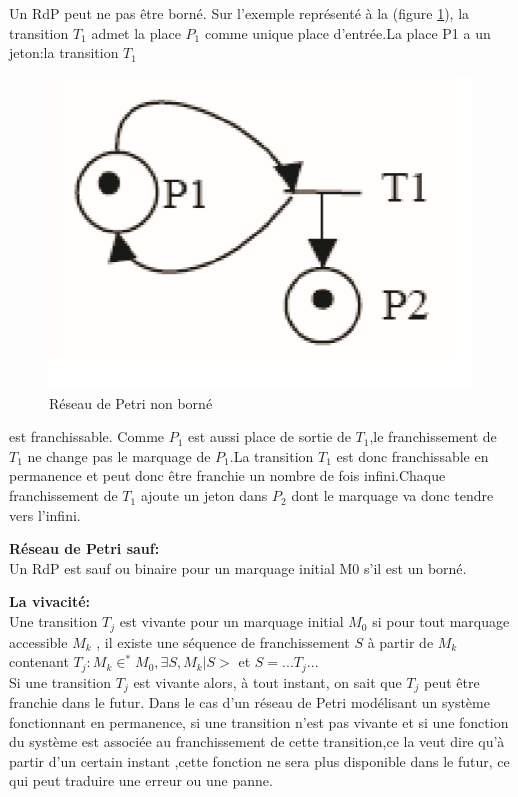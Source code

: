 \begin{exmp}
 Un RdP peut ne pas être borné. Sur l'exemple représenté à la (figure \ref{fig:rdpborn}), la transition $ T_{1} $ admet la place $ P_{1} $ comme unique place d'entrée.La place P1 a un jeton:la transition $ T_{1} $
\end{exmp}

\begin{figure}[h]
	\centering
	\includegraphics[width=0.5\linewidth]{images/Rdpborn}
	\caption{Réseau de Petri non borné}
	\label{fig:rdpborn}
\end{figure}

est franchissable. Comme $ P_{1} $ est aussi place de sortie de $ T_{1} $,le franchissement de $ T_{1} $ ne change pas le marquage de $ P_{1} $.La transition $ T_{1} $ est donc franchissable en permanence et peut donc être franchie un nombre de fois infini.Chaque franchissement de $ T_{1} $ ajoute un jeton dans $ P_{2} $ dont le marquage va donc tendre vers l'infini.

\begin{defn}\textbf{Réseau de Petri sauf:}\\
	Un RdP est sauf ou binaire pour un marquage initial M0 s'il est un borné.
 
\end{defn}


\begin{defn}\textbf{La vivacité:}\\
	Une transition $ T_{j} $ est vivante pour un marquage initial $ M_{0} $ si pour tout marquage accessible $ M_{k} $ , il existe une séquence de franchissement $ S $ à partir de $ M_{k} $ contenant $T_{j}: M_{k} \in^{*} M_{0},   \exists S,M_{k}| S>$ et $S = ... T_{j} ...$
	\\
	
	Si une transition $ T_{j} $ est vivante alors, à tout instant, on sait que $ T_{j} $ peut être franchie dans le futur. Dans le cas d'un réseau de Petri modélisant un système fonctionnant en permanence, si une transition n'est pas vivante et si une fonction du système est associée au franchissement de cette transition,ce la veut dire qu'à partir d’un certain instant ,cette fonction ne sera plus disponible dans le futur, ce qui peut traduire une erreur ou une panne.
	
\end{defn}

